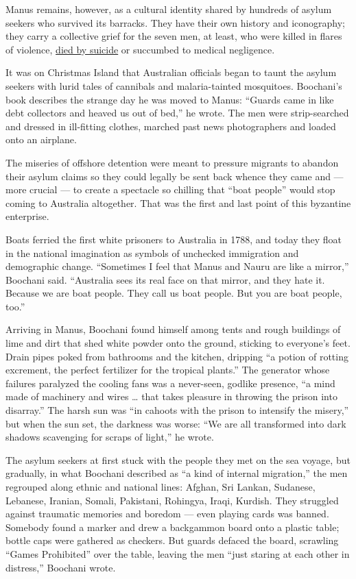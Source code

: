 Manus remains, however, as a cultural identity shared by hundreds of
asylum seekers who survived its barracks. They have their own history
and iconography; they carry a collective grief for the seven men, at
least, who were killed in flares of violence,
\href{https://www.nytimes3xbfgragh.onion/2019/06/26/world/australia/australia-manus-suicide.html}{died
by suicide} or succumbed to medical negligence.

It was on Christmas Island that Australian officials began to taunt the
asylum seekers with lurid tales of cannibals and malaria-tainted
mosquitoes. Boochani's book describes the strange day he was moved to
Manus: ``Guards came in like debt collectors and heaved us out of bed,''
he wrote. The men were strip-searched and dressed in ill-fitting
clothes, marched past news photographers and loaded onto an airplane.

The miseries of offshore detention were meant to pressure migrants to
abandon their asylum claims so they could legally be sent back whence
they came and --- more crucial --- to create a spectacle so chilling
that ``boat people'' would stop coming to Australia altogether. That was
the first and last point of this byzantine enterprise.

Boats ferried the first white prisoners to Australia in 1788, and today
they float in the national imagination as symbols of unchecked
immigration and demographic change. ``Sometimes I feel that Manus and
Nauru are like a mirror,'' Boochani said. ``Australia sees its real face
on that mirror, and they hate it. Because we are boat people. They call
us boat people. But you are boat people, too.''

Arriving in Manus, Boochani found himself among tents and rough
buildings of lime and dirt that shed white powder onto the ground,
sticking to everyone's feet. Drain pipes poked from bathrooms and the
kitchen, dripping ``a potion of rotting excrement, the perfect
fertilizer for the tropical plants.'' The generator whose failures
paralyzed the cooling fans was a never-seen, godlike presence, ``a mind
made of machinery and wires \ldots{} that takes pleasure in throwing the
prison into disarray.'' The harsh sun was ``in cahoots with the prison
to intensify the misery,'' but when the sun set, the darkness was worse:
``We are all transformed into dark shadows scavenging for scraps of
light,'' he wrote.

The asylum seekers at first stuck with the people they met on the sea
voyage, but gradually, in what Boochani described as ``a kind of
internal migration,'' the men regrouped along ethnic and national lines:
Afghan, Sri Lankan, Sudanese, Lebanese, Iranian, Somali, Pakistani,
Rohingya, Iraqi, Kurdish. They struggled against traumatic memories and
boredom --- even playing cards was banned. Somebody found a marker and
drew a backgammon board onto a plastic table; bottle caps were gathered
as checkers. But guards defaced the board, scrawling ``Games
Prohibited'' over the table, leaving the men ``just staring at each
other in distress,'' Boochani wrote.


